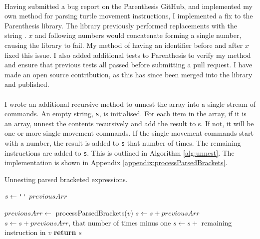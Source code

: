 \paragraph{} Having submitted a bug report on the Parenthesis GitHub, and implemented my own method for parsing turtle movement instructions, I implemented a fix to the Parenthesis library. The library previously performed replacements with the string . $x$ and following numbers would concatenate forming a single number, causing the library to fail. My method of having an identifier before and after $x$ fixed this issue. I also added additional tests to Parenthesis to verify my method and ensure that previous tests all passed before submitting a pull request. I have made an open source contribution, as this has since been merged into the library and published.

\paragraph{} I wrote an additional recursive method to unnest the array into a single stream of commands. An empty string, \texttt{s}, is initialised. For each item in the array, if it is an array, unnest the contents recursively and add the result to s. If not, it will be one or more single movement commands. If the single movement commands start with a number, the result is added to \texttt{s} that number of times. The remaining instructions are added to \texttt{s}. This is outlined in Algorithm \ref{alg:unnest}. The implementation is shown in Appendix \ref{appendix:processParsedBrackets}.

\begin{algorithm}[!htbp]
\caption{Unnesting parsed bracketed expressions.}
\label{alg:unnest}
\begin{algorithmic}[1]

   \State $s\gets \texttt{\upquote{}}$
   \State $previousArr$

     \State $previousArr \gets$ processParsedBrackets($v$)
    \Else
        \State $s \gets s + previousArr$
          \State $s \gets s + previousArr$, that number of times minus one
        \EndIf
       \EndIf
       \State $s \gets s + $ remaining instruction in $v$
    \EndIf
   \EndFor
   \State \textbf{return} $s$

\EndProcedure
\end{algorithmic}
\end{algorithm}

